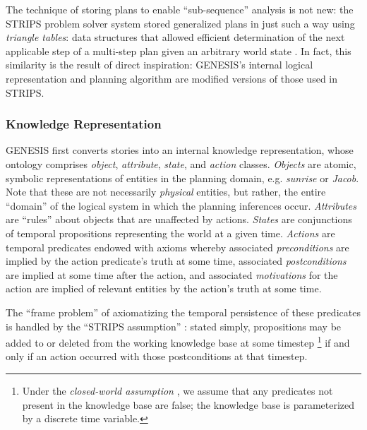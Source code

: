 The technique of storing plans to enable ``sub-sequence'' analysis is not new: the STRIPS problem solver system stored generalized plans in just such a way using \textit{triangle tables}: data structures that allowed efficient determination of the next applicable step of a multi-step plan given an arbitrary world state \citep{fikes1972}. In fact, this similarity is the result of direct inspiration: GENESIS's internal logical representation and planning algorithm are modified versions of those used in STRIPS.

\subsubsection{Knowledge Representation}

GENESIS first converts stories into an internal knowledge representation, whose ontology comprises \textit{object}, \textit{attribute}, \textit{state}, and \textit{action} classes. \textit{Objects} are atomic, symbolic representations of entities in the planning domain, e.g. \textit{sunrise} or \textit{Jacob}. Note that these are not necessarily \textit{physical} entities, but rather, the entire ``domain'' of the logical system in which the planning inferences occur. \textit{Attributes} are ``rules'' about objects that are unaffected by actions. \textit{States} are conjunctions of temporal propositions representing the world at a given time. \textit{Actions} are temporal predicates endowed with axioms whereby associated \textit{preconditions} are implied by the action predicate's truth at some time, associated \textit{postconditions} are implied at some time after the action, and associated \textit{motivations} for the action are implied of relevant entities by the action's truth at some time.

The ``frame problem'' \citep{mccarthy69} of axiomatizing the temporal persistence of these predicates is handled by the ``STRIPS assumption'' \citep{fikes1972}: stated simply, propositions may be added to or deleted from the working knowledge base at some timestep \footnote{Under the \textit{closed-world assumption} \citep{Reiter:1987:CWD:42641.42663}, we assume that any predicates not present in the knowledge base are false; the knowledge base is parameterized by a discrete time variable.} if and only if an action occurred with those postconditions at that timestep.

